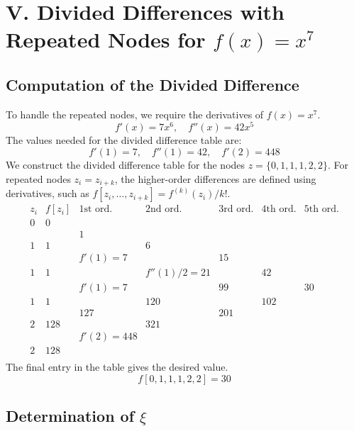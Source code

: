 \documentclass[a4paper]{article}
\begin{document}
\section*{V. Divided Differences with Repeated Nodes for $f(x)=x^7$}

\subsection*{Computation of the Divided Difference}

To handle the repeated nodes, we require the derivatives of $f(x)=x^7$.
\[
f'(x) = 7x^6, \quad f''(x) = 42x^5
\]
The values needed for the divided difference table are:
\[
f'(1)=7, \quad f''(1)=42, \quad f'(2)=448
\]
We construct the divided difference table for the nodes $z = \{0, 1, 1, 1, 2, 2\}$. For repeated nodes $z_i=z_{i+k}$, the higher-order differences are defined using derivatives, such as $f[z_i, \dots, z_{i+k}] = f^{(k)}(z_i)/k!$.
\[
\begin{array}{c|cccccc}
z_i & f[z_i] & \text{1st ord.} & \text{2nd ord.} & \text{3rd ord.} & \text{4th ord.} & \text{5th ord.} \\
\hline
0 & 0 & & & & & \\
& & 1 & & & & \\
1 & 1 & & 6 & & & \\
& & f'(1)=7 & & 15 & & \\
1 & 1 & & f''(1)/2=21 & & 42 & \\
& & f'(1)=7 & & 99 & & 30 \\
1 & 1 & & 120 & & 102 & \\
& & 127 & & 201 & & \\
2 & 128 & & 321 & & & \\
& & f'(2)=448 & & & & \\
2 & 128 & & & & & \\
\end{array}
\]
The final entry in the table gives the desired value.
\[
f[0, 1, 1, 1, 2, 2] = 30
\]

\subsection*{Determination of $\xi$}
\end{document}
